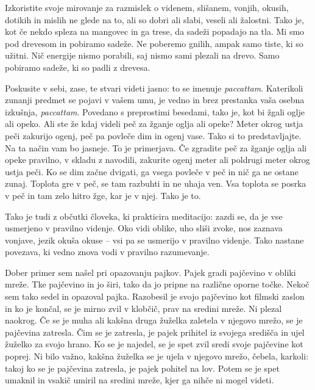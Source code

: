 
Izkoristite svoje mirovanje za razmislek o videnem, slišanem, vonjih, okusih, dotikih in mislih ne glede na to, ali so dobri ali slabi, veseli ali žalostni. Tako je, kot če nekdo spleza na mangovec in ga trese, da sadeži popadajo na tla. Mi smo pod drevesom in pobiramo sadeže. Ne poberemo gnilih, ampak samo tiste, ki so užitni. Nič energije nismo porabili, saj nismo sami plezali na drevo. Samo pobiramo sadeže, ki so padli z drevesa.

\clearpage


Poskusite v sebi, zase, te stvari videti jasno: to se imenuje \emph{paccattam}. Katerikoli zunanji predmet se pojavi v vašem umu, je vedno in brez prestanka vaša osebna izkušnja, \emph{paccattam}. Povedano s preprostimi besedami, tako je, kot bi žgali oglje ali opeko. Ali ste že kdaj videli peč za žganje oglja ali opeke? Meter okrog ustja peči zakurijo ogenj, peč pa povleče dim in ogenj vase. Tako si to predstavljajte. Na ta način vam bo jasneje. To je primerjava. Če zgradite peč za žganje oglja ali opeke pravilno, v skladu z navodili, zakurite ogenj meter ali poldrugi meter okrog ustja peči. Ko se dim začne dvigati, ga vsega povleče v peč in nič ga ne ostane zunaj. Toplota gre v peč, se tam razbuhti in ne uhaja ven. Vsa toplota se posrka v peč in tam zelo hitro žge, kar je v njej. Tako je to.

Tako je tudi z občutki človeka, ki prakticira meditacijo: zazdi se, da je vse usmerjeno v pravilno videnje. Oko vidi oblike, uho sliši zvoke, nos zaznava vonjave, jezik okuša okuse – vsi pa se usmerijo v pravilno videnje. Tako nastane povezava, ki vedno znova vodi v pravilno razumevanje.

\clearpage


Dober primer sem našel pri opazovanju pajkov. Pajek gradi pajčevino v obliki mreže. Tke pajčevino in jo širi, tako da jo pripne na različne oporne točke. Nekoč sem tako sedel in opazoval pajka. Razobesil je svojo pajčevino kot filmski zaslon in ko je končal, se je mirno zvil v klobčič, prav na sredini mreže. Ni plezal naokrog. Če se je muha ali kakšna druga žuželka zaletela v njegovo mrežo, se je pajčevina zatresla. Čim se je zatresla, je pajek prihitel iz svojega središča in ujel žuželko za svojo hrano. Ko se je najedel, se je spet zvil sredi svoje pajčevine kot poprej. Ni bilo važno, kakšna žuželka se je ujela v njegovo mrežo, čebela, karkoli: takoj ko se je pajčevina zatresla, je pajek pohitel na lov. Potem se je spet umaknil in vsakič umiril na sredini mreže, kjer ga nihče ni mogel videti.

